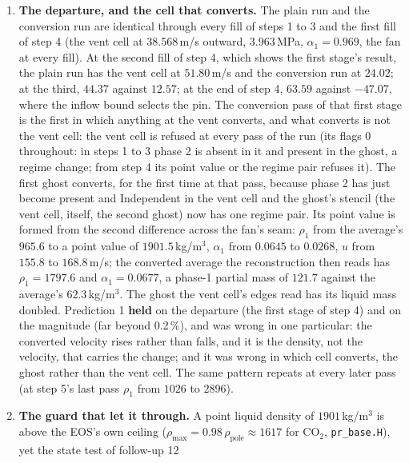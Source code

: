 \documentclass[11pt,a4paper]{article}
\newcommand{\code}[1]{\texttt{\small #1}}
\begin{document}
\begin{enumerate}[nosep]
\item \textbf{The departure, and the cell that converts.}  The plain
      run and the conversion run are identical through every fill of
      steps 1 to 3 and the first fill of step 4 (the vent cell at
      $38.568$\,m/s outward, $3.963$\,MPa, $\alpha_1 = 0.969$, the fan
      at every fill).  At the second fill of step 4, which shows the
      first stage's result, the plain run has the vent cell at
      $51.80$\,m/s and the conversion run at $24.02$; at the third,
      $44.37$ against $12.57$; at the end of step 4, $63.59$ against
      $-47.07$, where the inflow bound selects the pin.  The
      conversion pass of that first stage is the first in which
      anything at the vent converts, and what converts is not the vent
      cell: the vent cell is refused at every pass of the run (its
      flags 0 throughout: in steps 1 to 3 phase 2 is absent in it and
      present in the ghost, a regime change; from step 4 its point
      value or the regime pair refuses it).  The first ghost converts,
      for the first time at that pass, because phase 2 has just become
      present and Independent in the vent cell and the ghost's stencil
      (the vent cell, itself, the second ghost) now has one regime
      pair.  Its point value is formed from the second difference
      across the fan's seam: $\rho_1$ from the average's $965.6$ to a
      point value of $1901.5$\,kg/m$^3$, $\alpha_1$ from $0.0645$ to
      $0.0268$, $u$ from $155.8$ to $168.8$\,m/s; the converted average
      the reconstruction then reads has $\rho_1 = 1797.6$ and
      $\alpha_1 = 0.0677$, a phase-1 partial mass of $121.7$ against the
      average's $62.3$\,kg/m$^3$.  The ghost the vent cell's edges read
      has its liquid mass doubled.  Prediction 1 \textbf{held} on the
      departure (the first stage of step 4) and on the magnitude (far
      beyond 0.2\,\%), and was wrong in one particular: the converted
      velocity rises rather than falls, and it is the density, not the
      velocity, that carries the change; and it was wrong in which cell
      converts, the ghost rather than the vent cell.  The same pattern
      repeats at every later pass (at step 5's last pass $\rho_1$ from
      $1026$ to $2896$).
\item \textbf{The guard that let it through.}  A point liquid density
      of $1901$\,kg/m$^3$ is above the EOS's own ceiling
      ($\rho_{\max} = 0.98\,\rho_{\mathrm{pole}} \approx 1617$ for
      CO$_2$, \code{pr\_base.H}), yet the state test of follow-up 12

\end{enumerate}
\end{document}
